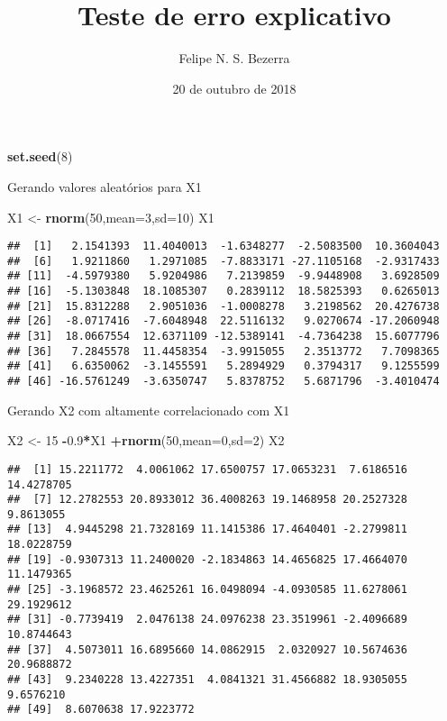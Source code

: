 \documentclass[]{article}
\title{Teste de erro explicativo}
\author{Felipe N. S. Bezerra}
\date{20 de outubro de 2018}
\newenvironment{Shaded}{\begin{snugshade}}{\end{snugshade}}
\newcommand{\KeywordTok}[1]{\textcolor[rgb]{0.13,0.29,0.53}{\textbf{#1}}}
\newcommand{\DataTypeTok}[1]{\textcolor[rgb]{0.13,0.29,0.53}{#1}}
\newcommand{\DecValTok}[1]{\textcolor[rgb]{0.00,0.00,0.81}{#1}}
\newcommand{\FloatTok}[1]{\textcolor[rgb]{0.00,0.00,0.81}{#1}}
\newcommand{\StringTok}[1]{\textcolor[rgb]{0.31,0.60,0.02}{#1}}
\newcommand{\OperatorTok}[1]{\textcolor[rgb]{0.81,0.36,0.00}{\textbf{#1}}}
\newcommand{\NormalTok}[1]{#1}
\begin{document}
\maketitle

\begin{Shaded}
\begin{Highlighting}[]
\KeywordTok{set.seed}\NormalTok{(}\DecValTok{8}\NormalTok{)}
\end{Highlighting}
\end{Shaded}

Gerando valores aleatórios para X1

\begin{Shaded}
\begin{Highlighting}[]
\NormalTok{X1 <-}\StringTok{ }\KeywordTok{rnorm}\NormalTok{(}\DecValTok{50}\NormalTok{,}\DataTypeTok{mean=}\DecValTok{3}\NormalTok{,}\DataTypeTok{sd=}\DecValTok{10}\NormalTok{)}
\NormalTok{X1}
\end{Highlighting}
\end{Shaded}

\begin{verbatim}
##  [1]   2.1541393  11.4040013  -1.6348277  -2.5083500  10.3604043
##  [6]   1.9211860   1.2971085  -7.8833171 -27.1105168  -2.9317433
## [11]  -4.5979380   5.9204986   7.2139859  -9.9448908   3.6928509
## [16]  -5.1303848  18.1085307   0.2839112  18.5825393   0.6265013
## [21]  15.8312288   2.9051036  -1.0008278   3.2198562  20.4276738
## [26]  -8.0717416  -7.6048948  22.5116132   9.0270674 -17.2060948
## [31]  18.0667554  12.6371109 -12.5389141  -4.7364238  15.6077796
## [36]   7.2845578  11.4458354  -3.9915055   2.3513772   7.7098365
## [41]   6.6350062  -3.1455591   5.2894929   0.3794317   9.1255599
## [46] -16.5761249  -3.6350747   5.8378752   5.6871796  -3.4010474
\end{verbatim}

Gerando X2 com altamente correlacionado com X1

\begin{Shaded}
\begin{Highlighting}[]
\NormalTok{X2 <-}\StringTok{ }\DecValTok{15} \OperatorTok{-}\FloatTok{0.9}\OperatorTok{*}\NormalTok{X1 }\OperatorTok{+}\KeywordTok{rnorm}\NormalTok{(}\DecValTok{50}\NormalTok{,}\DataTypeTok{mean=}\DecValTok{0}\NormalTok{,}\DataTypeTok{sd=}\DecValTok{2}\NormalTok{)}
\NormalTok{X2}
\end{Highlighting}
\end{Shaded}

\begin{verbatim}
##  [1] 15.2211772  4.0061062 17.6500757 17.0653231  7.6186516 14.4278705
##  [7] 12.2782553 20.8933012 36.4008263 19.1468958 20.2527328  9.8613055
## [13]  4.9445298 21.7328169 11.1415386 17.4640401 -2.2799811 18.0228759
## [19] -0.9307313 11.2400020 -2.1834863 14.4656825 17.4664070 11.1479365
## [25] -3.1968572 23.4625261 16.0498094 -4.0930585 11.6278061 29.1929612
## [31] -0.7739419  2.0476138 24.0976238 23.3519961 -2.4096689 10.8744643
## [37]  4.5073011 16.6895660 14.0862915  2.0320927 10.5674636 20.9688872
## [43]  9.2340228 13.4227351  4.0841321 31.4566882 18.9305055  9.6576210
## [49]  8.6070638 17.9223772
\end{verbatim}
\end{document}
